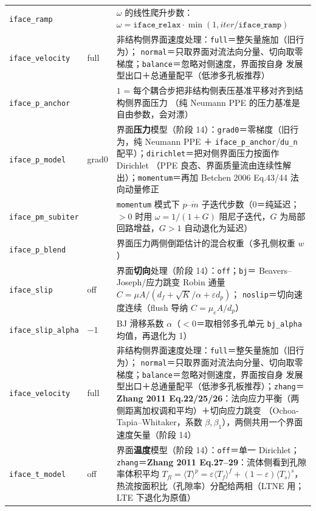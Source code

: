 {\begin{longtable}{@{}>{\raggedright\arraybackslash}p{}>{\raggedright\arraybackslash}p{}>{\raggedright\arraybackslash}p{}@{}}
\texttt{iface\_ramp} & 1  & $\omega$ 的线性爬升步数：$\omega = \texttt{iface\_relax}\cdot\min(1, iter/\texttt{iface\_ramp})$ \\
\texttt{iface\_velocity} & full & 非结构侧界面速度处理：\texttt{full}＝整矢量施加（旧行为）；
\texttt{normal}＝只取界面对流法向分量、切向取零梯度；\texttt{balance}＝忽略对侧速度，界面按自身
发展型出口＋总通量配平（低渗多孔板推荐）\\
\texttt{iface\_p\_anchor} & 0 & $1$ = 每个耦合步把非结构侧表压基准平移对齐到结构侧界面压力
（纯 Neumann PPE 的压力基准是自由参数，会对漂）\\
\texttt{iface\_p\_model} & grad0 & 界面\textbf{压力}模型（阶段 14）：\texttt{grad0}＝零梯度（旧行为，纯 Neumann PPE
＋ \texttt{iface\_p\_anchor}/\texttt{du\_n} 配平）；\texttt{dirichlet}＝把对侧界面压力按面作 Dirichlet
（PPE 良态、界面质量流由连续性解出）；\texttt{momentum}＝再加 Betchen 2006 Eq.43/44 法向动量修正 \\
\texttt{iface\_pm\_subiter} & 0 & \texttt{momentum} 模式下 $p$--$\dot m$ 子迭代步数（$0$＝纯延迟；$>0$ 时用
$\omega=1/(1+G)$ 阻尼子迭代，$G$ 为局部回路增益，$G>1$ 自动退化为延迟） \\
\texttt{iface\_p\_blend} & 0.5 & 界面压力两侧倒距估计的混合权重（多孔侧权重 $w$） \\
\texttt{iface\_slip} & off & 界面\textbf{切向}处理（阶段 14）：\texttt{off}；\texttt{bj}＝
Beavers--Joseph/应力跳变 Robin 通量 $C=\mu A/(d_f+\sqrt K/\alpha+\varepsilon d_p)$；
\texttt{noslip}＝切向速度连续（flush 导纳 $C=\mu_e A/d_p$） \\
\texttt{iface\_slip\_alpha} & $-1$ & BJ 滑移系数 $\alpha$（$<0$＝取相邻多孔单元 \texttt{bj\_alpha} 均值，再退化为 1） \\
\texttt{iface\_velocity} & full & 非结构侧界面速度处理：\texttt{full}＝整矢量施加（旧行为）；
\texttt{normal}＝只取界面对流法向分量、切向取零梯度；\texttt{balance}＝忽略对侧速度，界面按自身
发展型出口＋总通量配平（低渗多孔板推荐）；\texttt{zhang}＝
\textbf{Zhang 2011 Eq.22/25/26}：法向应力平衡（两侧距离加权调和平均）＋切向应力跳变
（Ochoa-Tapia--Whitaker，系数 $\beta,\beta_1$），两侧共用一个界面速度矢量（阶段 14） \\
\texttt{iface\_t\_model} & off & 界面\textbf{温度}模型（阶段 14）：\texttt{off}＝单一 Dirichlet；
\texttt{zhang}＝\textbf{Zhang 2011 Eq.27--29}：流体侧看到孔隙率体积平均
$T_{fl}=\langle T\rangle^p=\varepsilon\langle T_f\rangle^f+(1-\varepsilon)\langle T_s\rangle^s$，
热流按面积比（孔隙率）分配给两相（LTNE 用；LTE 下退化为原值） \\

\end{longtable}}
